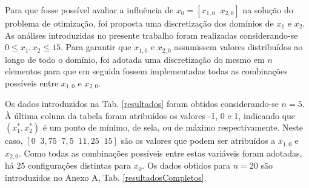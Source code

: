 \documentclass[12pt]{article}
\begin{document}
	Para que fosse possível avaliar a influência de $ x_0 = [x_{1,0} \;\; x_{2,0}] $ na solução do problema de otimização, foi proposta uma discretização dos domínios de $ x_1 $ e $ x_2 $. As análises introduzidas no presente trabalho foram realizadas considerando-se $ 0 \leq x_1, x_2 \leq 15  $. Para garantir que $ x_{1,0} $ e $ x_{2,0} $ assumissem valores distribuídos ao longo de todo o domínio, foi adotada uma discretização do mesmo em $ n $ elementos para que em seguida fossem implementadas todas as combinações possíveis entre $ x_{1,0} $ e $ x_{2,0} $. 
	
	Os dados introduzidos na Tab. \ref{resultados} foram obtidos considerando-se $ n = 5 $. À última coluna da tabela foram atribuídos os valores -1, 0 e 1, indicando que $ (x_1^*, x_2^*) $ é um ponto de mínimo, de sela, ou de máximo respectivamente. Neste caso, $ [0 \;\; 3,75 \;\; 7,5 \;\; 11,25 \;\; 15] $ são os valores que podem ser atribuídos a $ x_{1,0} $ e $ x_{2,0} $. Como todas as combinações possíveis entre estas variáveis foram adotadas, há 25 configurações distintas para $ x_0 $. Os dados obtidos para $ n = 20 $ são introduzidos no Anexo A, Tab. \ref{resultadosCompletos}.   
	
\end{document}
